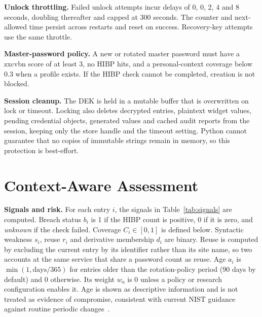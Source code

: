 \documentclass[conference]{IEEEtran}
\begin{document}
\textbf{Unlock throttling.} Failed unlock attempts incur delays of 0, 0, 2, 4 and 8 seconds, doubling thereafter and capped at 300 seconds. The counter and next-allowed time persist across restarts and reset on success. Recovery-key attempts use the same throttle.

\textbf{Master-password policy.} A new or rotated master password must have a zxcvbn score of at least 3, no HIBP hits, and a personal-context coverage below 0.3 when a profile exists. If the HIBP check cannot be completed, creation is not blocked.

\textbf{Session cleanup.} The DEK is held in a mutable buffer that is overwritten on lock or timeout. Locking also deletes decrypted entries, plaintext widget values, pending credential objects, generated values and cached audit reports from the session, keeping only the store handle and the timeout setting. Python cannot guarantee that no copies of immutable strings remain in memory, so this protection is best-effort.

\section{Context-Aware Assessment}
\textbf{Signals and risk.} For each entry $i$, the signals in Table~\ref{tab:signals} are computed. Breach status $b_i$ is 1 if the HIBP count is positive, 0 if it is zero, and \emph{unknown} if the check failed. Coverage $C_i\in[0,1]$ is defined below. Syntactic weakness $s_i$, reuse $r_i$ and derivative membership $d_i$ are binary. Reuse is computed by excluding the current entry by its identifier rather than its site name, so two accounts at the same service that share a password count as reuse. Age $a_i$ is $\min(1,\text{days}/365)$ for entries older than the rotation-policy period (90 days by default) and 0 otherwise. Its weight $w_a$ is 0 unless a policy or research configuration enables it. Age is shown as descriptive information and is not treated as evidence of compromise, consistent with current NIST guidance against routine periodic changes~\cite{nist63b4}.
\end{document}
